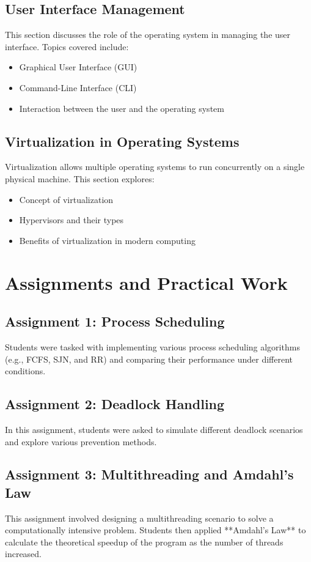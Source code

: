 \documentclass[12pt]{article}
\begin{document}
\subsection{User Interface Management}
This section discusses the role of the operating system in managing the user interface. Topics covered include:
\begin{itemize}
    \item Graphical User Interface (GUI)
    \item Command-Line Interface (CLI)
    \item Interaction between the user and the operating system
\end{itemize}

\subsection{Virtualization in Operating Systems}
Virtualization allows multiple operating systems to run concurrently on a single physical machine. This section explores:
\begin{itemize}
    \item Concept of virtualization
    \item Hypervisors and their types
    \item Benefits of virtualization in modern computing
\end{itemize}

\section{Assignments and Practical Work}
\subsection{Assignment 1: Process Scheduling}
Students were tasked with implementing various process scheduling algorithms (e.g., FCFS, SJN, and RR) and comparing their performance under different conditions.

\subsection{Assignment 2: Deadlock Handling}
In this assignment, students were asked to simulate different deadlock scenarios and explore various prevention methods.

\subsection{Assignment 3: Multithreading and Amdahl's Law}
This assignment involved designing a multithreading scenario to solve a computationally intensive problem. Students then applied **Amdahl's Law** to calculate the theoretical speedup of the program as the number of threads increased.
\end{document}
